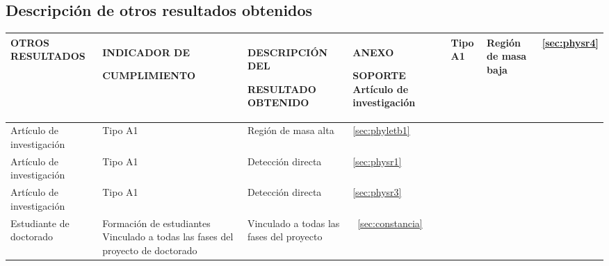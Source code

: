 \begin{landscape}
  \section{Descripción de otros resultados obtenidos}

\hspace{-1cm}  \begin{longtable}{|p{}|p{}|p{}|p{}|}\hline
 \parbox[t]{0.23\textwidth}{\centering \textbf{OTROS RESULTADOS}} &
\centering  \textbf{INDICADOR DE} \par
\textbf{CUMPLIMIENTO} &\centering \textbf{DESCRIPCIÓN DEL} \par
\textbf{RESULTADO OBTENIDO}   &\centering \textbf{ANEXO}\par \textbf{SOPORTE}\endhead\hline
Artículo de investigación&Tipo A1 &Región de masa baja \cite{Calle:2018ovc}  &
\ref{sec:physr4}\\\hline
Artículo de investigación&Tipo A1 &Región de masa alta \cite{Reig:2018ztc} &\ref{sec:phyletb1}\\\hline
Artículo de investigación&Tipo A1 &Detección directa \cite{Reig:2018mdk}  &\ref{sec:physr1}\\\hline
Artículo de investigación&Tipo A1 &Detección directa \cite{Bernal:2018aon} &\ref{sec:physr3}\\\hline
Estudiante de doctorado  &Formación de estudiantes Vinculado a todas las fases del proyecto de doctorado   & Vinculado a todas las fases del proyecto&~\ref{sec:constancia}\\\hline
  \end{longtable}
  

\end{landscape}
